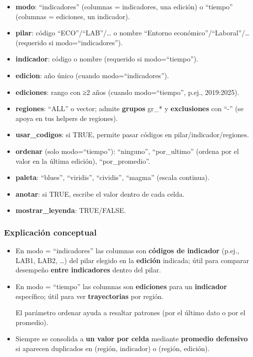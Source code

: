\documentclass[
  11pt,
  letterpaper,
  DIV=11,
  numbers=noendperiod]{scrartcl}
\begin{document}
\begin{itemize}
\item
  \textbf{modo}: ``indicadores'' (columnas = indicadores, una edición) o
  ``tiempo'' (columnas = ediciones, un indicador).
\item
  \textbf{pilar}: código ``ECO''/``LAB''/\ldots{} o nombre ``Entorno
  económico''/``Laboral''/\ldots{} (requerido si modo=``indicadores'').
\item
  \textbf{indicador}: código o nombre (requerido si modo=``tiempo'').
\item
  \textbf{edicion}: año único (cuando modo=``indicadores'').
\item
  \textbf{ediciones}: rango con ≥2 años (cuando modo=``tiempo'', p.ej.,
  2019:2025).
\item
  \textbf{regiones}: ``ALL'' o vector; admite \textbf{grupos} gr\_* y
  \textbf{exclusiones} con ``-'' (se apoya en tus helpers de regiones).
\item
  \textbf{usar\_codigos}: si TRUE, permite pasar códigos en
  pilar/indicador/regiones.
\item
  \textbf{ordenar} (solo modo=``tiempo''): ``ninguno'', ``por\_ultimo''
  (ordena por el valor en la última edición), ``por\_promedio''.
\item
  \textbf{paleta}: ``blues'', ``viridis'', ``cividis'', ``magma''
  (escala continua).
\item
  \textbf{anotar}: si TRUE, escribe el valor dentro de cada celda.
\item
  \textbf{mostrar\_leyenda}: TRUE/FALSE.
\end{itemize}

\subsubsection{\texorpdfstring{\textbf{Explicación
conceptual}}{Explicación conceptual}}\label{explicaciuxf3n-conceptual-18}

\begin{itemize}
\item
  En modo = ``indicadores'' las columnas son \textbf{códigos de
  indicador} (p.ej., LAB1, LAB2, \ldots) del pilar elegido en la
  \textbf{edición} indicada; útil para comparar desempeño \textbf{entre
  indicadores} dentro del pilar.
\item
  En modo = ``tiempo'' las columnas son \textbf{ediciones} para un
  \textbf{indicador} específico; útil para ver \textbf{trayectorias} por
  región.

  El parámetro ordenar ayuda a resaltar patrones (por el último dato o
  por el promedio).
\item
  Siempre se consolida a \textbf{un valor por celda} mediante
  \textbf{promedio defensivo} si aparecen duplicados en (región,
  indicador) o (región, edición).
\end{itemize}
\end{document}
